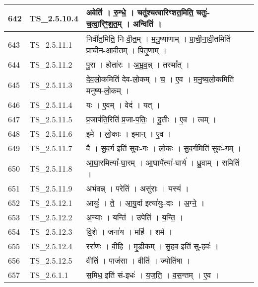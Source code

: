 \documentclass[17pt]{extarticle}
\begin{document}
\begin{longtable}{||p{0.4in}||p{0.9in}||p{4.0in}||p{0.9in}||}
        \hline
            642 & TS\_2.5.10.4 & अवेति॑   ।   रु॒न्धे॒   ।   चतु॑श्चत्वारिꣳशत॒मिति॒ चतुः॑{-}च॒त्वा॒रिꣳ॒॒श॒त॒म्   ।   अन्विति॑   ।    &      \\
        \hline
            643 & TS\_2.5.11.1 & निवी॑त॒मिति॒ नि{-}वी॒त॒म्   ।   म॒नु॒ष्या॑णाम्   ।   प्रा॒ची॒ना॒वी॒तमिति॑ प्राचीन{-}आ॒वी॒तम्   ।   पि॒तृ॒णाम्   ।    &      \\
        \hline
            644 & TS\_2.5.11.2 & पु॒रा   ।   होता॑रः   ।   अ॒भू॒व॒न्न्   ।   तस्मा᳚त्   ।    &      \\
        \hline
            645 & TS\_2.5.11.3 & दे॒व॒लो॒कमिति॑ देव{-}लो॒कम्   ।   च॒   ।   ए॒व   ।   म॒नु॒ष्य॒लो॒कमिति॑ मनुष्य{-}लो॒कम्   ।    &      \\
        \hline
            646 & TS\_2.5.11.4 & यः   ।   ए॒वम्   ।   वेद॑   ।   यत्   ।    &      \\
        \hline
            647 & TS\_2.5.11.5 & प्र॒जाप॑ति॒रिति॑ प्र॒जा{-}प॒तिः॒   ।   दू॒तीः   ।   ए॒व   ।   त्वम्   ।    &      \\
        \hline
            648 & TS\_2.5.11.6 & इ॒मे   ।   लो॒काः   ।   इ॒मान्   ।   ए॒व   ।    &      \\
        \hline
            649 & TS\_2.5.11.7 & वै   ।   सु॒व॒र्ग इति॑ सुवः{-}गः   ।   लो॒कः   ।   सु॒व॒र्गमिति॑ सुवः{-}गम्   ।    &      \\
        \hline
            650 & TS\_2.5.11.8 & आ॒घा॒रमित्या᳚{-}घा॒रम्   ।   आ॒घार्येत्या᳚{-}घार्य॑   ।   ध्रु॒वाम्   ।   समिति॑   ।    &      \\
        \hline
            651 & TS\_2.5.11.9 & अभ॑वन्न्   ।   परेति॑   ।   असु॑राः   ।   यस्य॑   ।    &      \\
        \hline
            652 & TS\_2.5.12.1 & आयुः॑   ।   ते॒   ।   आ॒यु॒र्दा इत्या॑युः{-}दाः   ।   अ॒ग्ने॒   ।    &      \\
        \hline
            653 & TS\_2.5.12.2 & अ॒न्याः   ।   यन्ति॑   ।   उपेति॑   ।   य॒न्ति॒   ।    &      \\
        \hline
            654 & TS\_2.5.12.3 & वि॒शे   ।   जना॑य   ।   महि॑   ।   शर्म॑   ।    &      \\
        \hline
            655 & TS\_2.5.12.4 & ररा॑णः   ।   वी॒हि   ।   मृ॒डी॒कम्   ।   सु॒हव॒ इति॑ सु{-}हवः॑   ।    &      \\
        \hline
            656 & TS\_2.5.12.5 & वीति॑   ।   पाज॑सा   ।   वीति॑   ।   ज्योति॑षा   ।    &      \\
        \hline
            657 & TS\_2.6.1.1 & स॒मिध॒ इति॑ सं{-}इधः॑   ।   य॒ज॒ति॒   ।   व॒स॒न्तम्   ।   ए॒व   ।    &      \\

\end{longtable}
\end{document}
